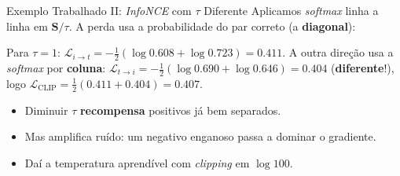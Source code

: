 \documentclass[aspectratio=169,xcolor=dvipsnames]{beamer}
\begin{document}
  \begin{frame}{Exemplo Trabalhado II: \textit{InfoNCE} com $\tau$ Diferente}
    Aplicamos \textit{softmax} linha a linha em $\mathbf{S}/\tau$. A perda usa a probabilidade do par correto (a \textbf{diagonal}):
    \vspace{0.2em}
    \centering

    \vspace{0.3em}
    {\small Para $\tau{=}1$: $\mathcal{L}_{i\to t} = -\tfrac{1}{2}(\log 0.608 + \log 0.723) = 0.411$. A outra direção usa a \textit{softmax} por \textbf{coluna}: $\mathcal{L}_{t\to i} = -\tfrac{1}{2}(\log 0.690 + \log 0.646) = 0.404$ (\textbf{diferente}!), logo $\mathcal{L}_{\text{CLIP}} = \tfrac{1}{2}(0.411 + 0.404) = 0.407$.}

    \vspace{0.2em}
    \begin{itemize}\setlength{\itemsep}{0pt}
      \item Diminuir $\tau$ \textbf{recompensa} positivos já bem separados.
      \item Mas amplifica ruído: um negativo enganoso passa a dominar o gradiente.
      \item Daí a temperatura aprendível com \textit{clipping} em $\log 100$.
    \end{itemize}
  \end{frame}
\end{document}
